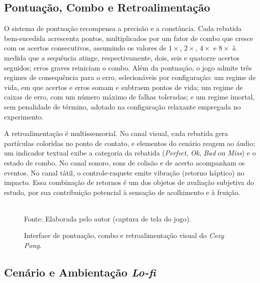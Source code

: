 \subsection{Pontuação, Combo e Retroalimentação}\label{subsec:pontuacao}

O sistema de pontuação recompensa a precisão e a constância. Cada rebatida bem-sucedida acrescenta pontos, multiplicados por um fator de combo que cresce com os acertos consecutivos, assumindo os valores de $1\times$, $2\times$, $4\times$ e $8\times$ à medida que a sequência atinge, respectivamente, dois, seis e quatorze acertos seguidos; erros graves reiniciam o combo. Além da pontuação, o jogo admite três regimes de consequência para o erro, selecionáveis por configuração: um regime de vida, em que acertos e erros somam e subtraem pontos de vida; um regime de caixas de erro, com um número máximo de falhas toleradas; e um regime imortal, sem penalidade de término, adotado na configuração relaxante empregada no experimento.

A retroalimentação é multissensorial. No canal visual, cada rebatida gera partículas coloridas no ponto de contato, e elementos do cenário reagem ao áudio; um indicador textual exibe a categoria da rebatida (\textit{Perfect}, \textit{Ok}, \textit{Bad} ou \textit{Miss}) e o estado de combo. No canal sonoro, sons de colisão e de acerto acompanham os eventos. No canal tátil, o controle-raquete emite vibração (retorno háptico) no impacto. Essa combinação de retornos é um dos objetos de avaliação subjetiva do estudo, por sua contribuição potencial à sensação de acolhimento e à fruição.

\begin{figure}[H]
    \centering
    \caption{Interface de pontuação, combo e retroalimentação visual do \textit{Cozy Pong}. }
    \label{fig:hud}
    \\[2pt]
    {\footnotesize Fonte: Elaborada pelo autor (captura de tela do jogo).}
\end{figure}

\subsection{Cenário e Ambientação \textit{Lo-fi}}\label{subsec:cenario}

